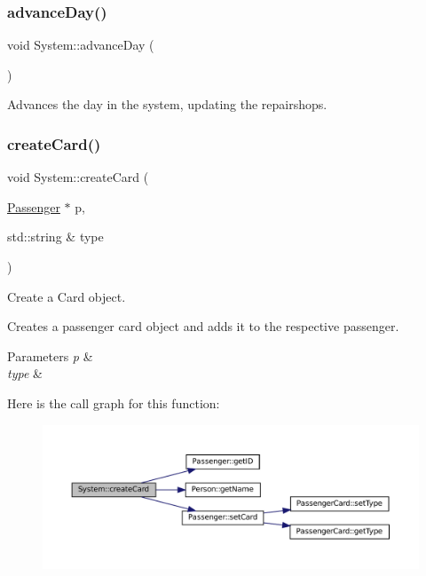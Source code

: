 \subsubsection{\texorpdfstring{advance\+Day()}{advanceDay()}}
{\footnotesize\ttfamily void System\+::advance\+Day (\begin{DoxyParamCaption}{ }\end{DoxyParamCaption})}

Advances the day in the system, updating the repairshops. \mbox{\label{classSystem_a22dc3f27200865820d450576e129a3f9}} 
\subsubsection{\texorpdfstring{create\+Card()}{createCard()}}
{\footnotesize\ttfamily void System\+::create\+Card (\begin{DoxyParamCaption}\item[{\mbox{\hyperlink{classPassenger}{Passenger}} $\ast$}]{p,  }\item[{std\+::string \&}]{type }\end{DoxyParamCaption})}



Create a Card object. 

Creates a passenger card object and adds it to the respective passenger.


\begin{DoxyParams}{Parameters}
{\em p} & \\
\hline
{\em type} & \\
\hline
\end{DoxyParams}
Here is the call graph for this function\+:
\nopagebreak
\begin{figure}[H]
\begin{center}
\leavevmode
\includegraphics[width=350pt]{classSystem_a22dc3f27200865820d450576e129a3f9_cgraph}
\end{center}
\end{figure}
\mbox{\label{classSystem_ae08e68de517d1a18828c55ff3fab2cc9}} 
